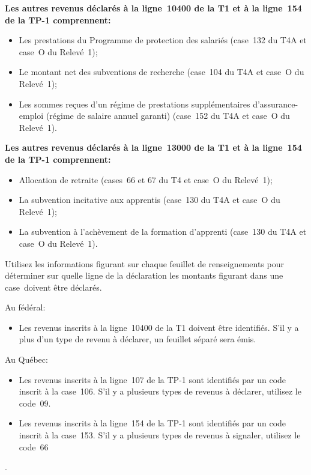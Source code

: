 \textbf{Les autres revenus déclarés à la ligne~10400 de la T1 et à la ligne~154 de la TP-1 comprennent:}
\begin{itemize}
	\item Les prestations du Programme de protection des salariés (case~132 du T4A et case~O du Relevé~1);
	\item Le montant net des subventions de recherche (case~104 du T4A et case~O du Relevé~1);
	\item Les sommes reçues d'un régime de prestations supplémentaires d'assurance-emploi (régime de salaire annuel garanti) (case~152 du T4A et case~O du Relevé~1).
\end{itemize}

\textbf{Les autres revenus déclarés à la ligne~13000 de la T1 et à la ligne~154 de la TP-1 comprennent:}

\begin{itemize}
	\item Allocation de retraite (cases~66 et 67 du T4 et case~O du Relevé~1);
	\item La subvention incitative aux apprentis (case~130 du T4A et case~O du Relevé~1);
	\item La subvention à l'achèvement de la formation d'apprenti (case~130 du T4A et case~O du Relevé~1).
\end{itemize}

\begin{note}
	Utilisez les informations figurant sur chaque feuillet de renseignements pour déterminer sur quelle ligne de la déclaration les montants figurant dans une case~doivent être déclarés.
	
	Au fédéral:
	\begin{itemize}
		\item Les revenus inscrits à la ligne~10400 de la T1 doivent être identifiés. S'il y a plus d'un type de revenu à déclarer, un feuillet séparé sera émis.
	\end{itemize}
	
	Au Québec:
	\begin{itemize}
		\item Les revenus inscrits à la ligne~107 de la TP-1 sont identifiés par un code inscrit à la case~106. S'il y a plusieurs types de revenus à déclarer, utilisez le code~09.
		\item Les revenus inscrits à la ligne~154 de la TP-1 sont identifiés par un code inscrit à la case~153. S'il y a plusieurs types de revenus à signaler, utilisez le code~66
	\end{itemize}.
\end{note}


